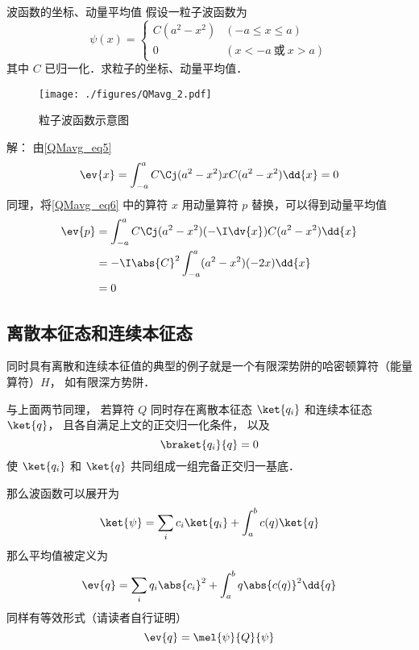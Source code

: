 \begin{example}{波函数的坐标、动量平均值}
假设一粒子波函数为
\begin{equation}
\psi(x)=
\begin{cases}
C(a^2-x^2) &(-a\leqslant x\leqslant a)\\
0 &(x<-a \ \text{或}\ x>a) 
\end{cases}
\end{equation}
其中 $C$ 已归一化．求粒子的坐标、动量平均值．

\begin{figure}[ht]
\centering
\texttt{[image: ./figures/QMavg\_2.pdf]}
\caption{粒子波函数示意图} \label{QMavg_fig2}
\end{figure}

解： 由\autoref{QMavg_eq5} 
\begin{equation}\label{QMavg_eq6}
\ev{x}= \int_{-a}^a C\Cj(a^2-x^2)xC(a^2-x^2)\dd{x} = 0
\end{equation}
同理，将\autoref{QMavg_eq6} 中的算符 $x$ 用动量算符 $p$ 替换，可以得到动量平均值
\begin{equation}
\begin{aligned}
\ev{p} &= \int_{-a}^a C\Cj(a^2-x^2)(-\I\dv{x})C(a^2-x^2)\dd{x}\\
&= -\I\abs{C}^2\int_{-a}^a (a^2-x^2)(-2x)\dd{x}\\
&= 0
\end{aligned}
\end{equation}
\end{example}

\subsection{离散本征态和连续本征态}
同时具有离散和连续本征值的典型的例子就是一个有限深势阱的哈密顿算符（能量算符）$H$， 如有限深方势阱．

与上面两节同理， 若算符 $Q$ 同时存在离散本征态 $\ket{q_i}$ 和连续本征态 $\ket{q}$， 且各自满足上文的正交归一化条件， 以及
\begin{equation}
\braket{q_i}{q} = 0
\end{equation}
使 $\ket{q_i}$ 和 $\ket{q}$ 共同组成一组完备正交归一基底．

那么波函数可以展开为
\begin{equation}
\ket{\psi} = \sum_i c_i \ket{q_i} + \int_a^b c(q) \ket{q}
\end{equation}
那么平均值被定义为
\begin{equation}
\ev{q} = \sum_i q_i \abs{c_i}^2 + \int_a^b q \abs{c(q)}^2 \dd{q}
\end{equation}
同样有等效形式（请读者自行证明）
\begin{equation}
\ev{q} = \mel{\psi}{Q}{\psi}
\end{equation}

